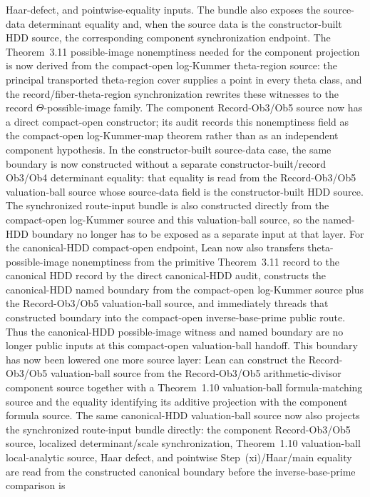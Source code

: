 \documentclass[11pt]{article}
\theoremstyle{plain}
\theoremstyle{definition}
\theoremstyle{remark}
\begin{document}
Haar-defect, and pointwise-equality inputs.  The bundle also exposes the
source-data determinant equality and, when the source data is the
constructor-built HDD source, the corresponding component synchronization
endpoint.  The Theorem~3.11 possible-image nonemptiness needed for the
component projection is now derived from the compact-open log-Kummer
theta-region source: the principal transported theta-region cover supplies a
point in every theta class, and the record/fiber-theta-region synchronization
rewrites these witnesses to the record \(\Theta\)-possible-image family.  The
component Record-Ob3/Ob5 source now has a direct compact-open constructor; its
audit records this nonemptiness field as the compact-open log-Kummer-map theorem
rather than as an independent component hypothesis.  In
the constructor-built source-data case, the same boundary is now constructed
without a separate constructor-built/record Ob3/Ob4 determinant equality: that
equality is read from the Record-Ob3/Ob5 valuation-ball source whose
source-data field is the constructor-built HDD source.  The synchronized
route-input bundle is also constructed directly from the compact-open
log-Kummer source and this valuation-ball source, so the named-HDD boundary no
longer has to be exposed as a separate input at that layer.
For the canonical-HDD compact-open endpoint, Lean now also transfers
theta-possible-image nonemptiness from the primitive Theorem~3.11 record to the
canonical HDD record by the direct canonical-HDD audit, constructs the
canonical-HDD named boundary from the compact-open log-Kummer source plus the
Record-Ob3/Ob5 valuation-ball source, and immediately threads that constructed
boundary into the compact-open inverse-base-prime public route.  Thus the
canonical-HDD possible-image witness and named boundary are no longer public
inputs at this compact-open valuation-ball handoff.  This boundary has now been
lowered one more source layer: Lean can construct the Record-Ob3/Ob5
valuation-ball source from the Record-Ob3/Ob5 arithmetic-divisor component
source together with a Theorem~1.10 valuation-ball formula-matching source and
the equality identifying its additive projection with the component formula
source.  The same canonical-HDD
valuation-ball source now also projects the synchronized route-input bundle
directly: the component Record-Ob3/Ob5 source, localized determinant/scale
synchronization, Theorem~1.10 valuation-ball local-analytic source, Haar
defect, and pointwise Step~(xi)/Haar/main equality are read from the
constructed canonical boundary before the inverse-base-prime comparison is
\end{document}
